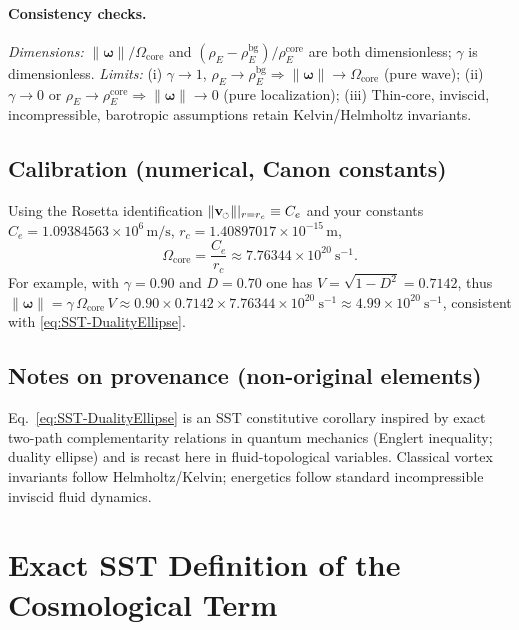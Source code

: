 \documentclass[10pt,reprint,aps,onecolumn,nofootinbib]{revtex4-2}
\newcommand{\vnorm}{\lVert \mathbf{v}_{\mkern-2mu\scriptscriptstyle\boldsymbol{\circlearrowleft}} \rVert}               %
\newcommand{\rhoE}{\rho_{\!E}}                           %
\newcommand{\rc}{r_c}                                    %
\newcommand{\omegaVec}{\boldsymbol{\omega}}
\newcommand{\OmegaCore}{\Omega_{\mathrm{core}}}
\newcommand{\bg}{\mathrm{bg}}
\newcommand{\core}{\mathrm{core}}
\begin{document}
\paragraph{Consistency checks.}
    \emph{Dimensions:} $\lVert\omegaVec\rVert/\OmegaCore$ and $(\rhoE-\rhoE^{\bg})/\rhoE^{\core}$ are both dimensionless; $\gamma$ is dimensionless.
    \emph{Limits:}
    (i) $\gamma\to1$, $\rhoE\to\rhoE^{\bg}\Rightarrow \lVert\omegaVec\rVert\to\OmegaCore$ (pure wave);
    (ii) $\gamma\to0$ or $\rhoE\!\to\!\rhoE^{\core}\Rightarrow \lVert\omegaVec\rVert\to0$ (pure localization);
    (iii) Thin-core, inviscid, incompressible, barotropic assumptions retain Kelvin/Helmholtz invariants.

\subsection{Calibration (numerical, Canon constants)}
\label{subsec:Calibration-DE}

Using the Rosetta identification $\vnorm|_{r=\rc}\equiv C_e$ and your constants
$C_e=1.09384563\times10^{6}\,\mathrm{m/s}$, $\rc=1.40897017\times10^{-15}\,\mathrm{m}$,
\begin{equation}
    \OmegaCore=\frac{C_e}{\rc} \approx 7.76344\times10^{20}\ \mathrm{s}^{-1}.
\end{equation}
For example, with $\gamma=0.90$ and $D=0.70$ one has
$V=\sqrt{1-D^{2}}=0.7142$, thus $\lVert\omegaVec\rVert=\gamma\,\OmegaCore\,V\approx
0.90\times 0.7142\times 7.76344\times10^{20}\ \mathrm{s}^{-1}\approx 4.99\times10^{20}\ \mathrm{s}^{-1}$,
consistent with \eqref{eq:SST-DualityEllipse}.

\subsection*{Notes on provenance (non-original elements)}
Eq.~\eqref{eq:SST-DualityEllipse} is an SST constitutive corollary inspired by exact
two-path complementarity relations in quantum mechanics (Englert inequality; duality ellipse)
and is recast here in fluid-topological variables. Classical vortex invariants follow
Helmholtz/Kelvin; energetics follow standard incompressible inviscid fluid dynamics.



\section{Exact SST Definition of the Cosmological Term}
\label{sec:SST-Lambda-exact}
\end{document}
